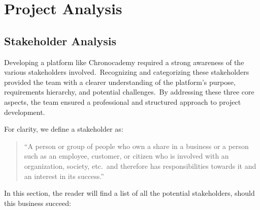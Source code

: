 \chapter{Project Analysis}\label{ch:project-analysis}

\section{Stakeholder Analysis}\label{sec:stakeholders-analysis}
Developing a platform like Chronocademy required a strong awareness of the various stakeholders involved.\ Recognizing and categorizing these stakeholders provided the team with a clearer understanding of the platform’s purpose, requirements hierarchy, and potential challenges.\ By addressing these three core aspects, the team ensured a professional and structured approach to project development.

For clarity, we define a stakeholder as:

\begin{quote}
``A person or group of people who own a share in a business or a person such as an employee, customer, or citizen who is involved with an organization, society, etc.\ and therefore has responsibilities towards it and an interest in its success.''
\end{quote}\cite{stakeholder}

In this section, the reader will find a list of all the potential stakeholders, should this business succeed:

